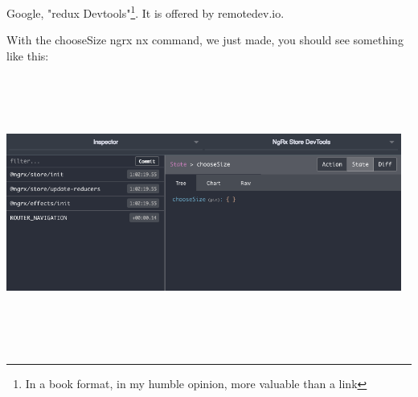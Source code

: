 Google, "redux Devtools"\footnote{In a book format, in my humble opinion, more
valuable than a link}. It is offered by remotedev.io.

With the chooseSize ngrx nx command, we just made, you should see something like
this:

\includegraphics[width=13cm, height=9cm]{state/ngrx-store/redux-store}
